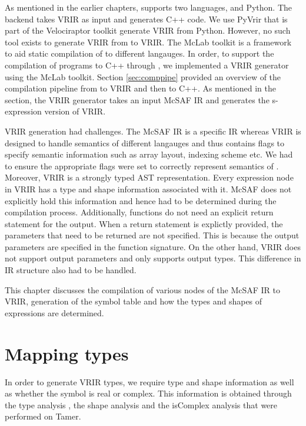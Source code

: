 As mentioned in the earlier chapters, \velocty supports two languages, \matlab and Python. The \velocty backend takes VRIR as input and generates C++ code. We use PyVrir that is part of the Velociraptor toolkit generate VRIR from Python. However, no such tool exists to generate VRIR from \matlab to VRIR. The McLab toolkit is a framework to aid static compilation of \matlab to different langauges. In order, to support the compilation of \matlab programs to C++ through \velocty, we implemented a VRIR generator using the McLab toolkit. Section \ref{sec:comppipe} provided an overview of the compilation pipeline from \matlab to VRIR and then to C++. As mentioned in the section, the VRIR generator takes an input McSAF IR and generates the s-expression version of VRIR.

VRIR generation had challenges. The McSAF IR is a \matlab specific IR whereas VRIR is designed to handle semantics of different langauges and thus contains flags to specify semantic information such as array layout, indexing scheme etc. We had to ensure the appropriate flags were set to correctly represent semantics of \matlab. Moreover, VRIR is a strongly typed AST representation. Every expression node in VRIR has a type  and shape information associated with it. McSAF does not explicitly hold this information and hence had to be determined during the compilation process. Additionally, \matlab functions do not need an explicit return statement for the output. When a return statement is explictly provided, the parameters that need to be returned are not specified. This is because the output parameters are specified in the function signature. On the other hand, VRIR does not support output parameters and only supports output types. This difference in IR structure also had to be handled.

This chapter discusses the compilation of various nodes of the McSAF IR to VRIR, generation of the symbol table and how the types and shapes of expressions are determined.
\section{Mapping types}
In order to generate VRIR types, we require type and shape information as well as whether the symbol is real or complex. This information is obtained through the type analysis , the shape analysis and the isComplex analysis that were performed on Tamer. 

